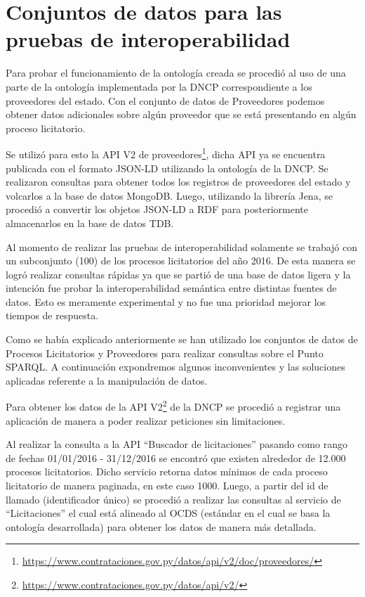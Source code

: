 \section{Conjuntos de datos para las pruebas de interoperabilidad}

Para probar el funcionamiento de la ontología creada se procedió al uso de una parte de la ontología implementada por la DNCP correspondiente a los proveedores del estado. Con el conjunto de datos de Proveedores podemos obtener datos adicionales sobre algún proveedor que se está presentando en algún proceso licitatorio.

Se utilizó para esto la API V2 de proveedores\footnote{\url{https://www.contrataciones.gov.py/datos/api/v2/doc/proveedores/}}, dicha API ya se encuentra publicada con el formato JSON-LD utilizando la ontología de la DNCP. Se realizaron consultas para obtener todos los registros de proveedores del estado y volcarlos a la base de datos MongoDB. Luego, utilizando la librería Jena, se procedió a convertir los objetos JSON-LD a RDF para posteriormente almacenarlos en la base de datos TDB.

Al momento de realizar las pruebas de interoperabilidad solamente se trabajó con un subconjunto (100) de los procesos licitatorios del año 2016. De esta manera se logró realizar consultas rápidas ya que se partió de una base de datos ligera y la intención fue probar la interoperabilidad semántica entre distintas fuentes de datos. Esto es meramente experimental y no fue una prioridad mejorar los tiempos de respuesta.

Como se había explicado anteriormente se han utilizado los conjuntos de datos de Procesos Licitatorios y Proveedores para realizar consultas sobre el Punto SPARQL. A continuación expondremos algunos inconvenientes y las soluciones aplicadas referente a la manipulación de datos.

Para obtener los datos de la API V2\footnote{\url{https://www.contrataciones.gov.py/datos/api/v2/}} de la DNCP se procedió a registrar una aplicación de manera a poder realizar peticiones sin limitaciones.

Al realizar la consulta a la API “Buscador de licitaciones” pasando como rango de fechas 01/01/2016 - 31/12/2016 se encontró que existen alrededor de 12.000 procesos licitatorios.
Dicho servicio retorna datos mínimos de cada proceso licitatorio de manera paginada, en este caso 1000. Luego, a partir del id de llamado (identificador único) se procedió a realizar las consultas al servicio de “Licitaciones” el cual está alineado al OCDS (estándar en el cual se basa la ontología desarrollada) para obtener los datos de manera más detallada.

